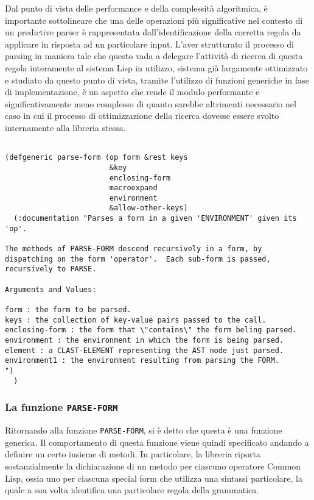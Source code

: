 Dal punto di vista delle performance e della complessità algoritmica, è
importante sottolineare che una delle operazioni più significative nel contesto
di un predictive parser è rappresentata dall’identificazione della corretta
regola da applicare in risposta ad un particolare input. L’aver strutturato il
processo di parsing in maniera tale che questo vada a delegare l'attività di
ricerca di questa regola interamente al sistema Lisp in utilizzo, sistema già
largamente ottimizzato e studiato da questo punto di vista, tramite l’utilizzo
di funzioni generiche in fase di implementazione, è un aspetto che rende il
modulo performante e significativamente meno complesso di quanto sarebbe
altrimenti necessario nel caso in cui il processo di ottimizzazione della
ricerca dovesse essere svolto internamente alla libreria stessa.

\begin{lstlisting}[caption=Signature della funzione \texttt{PARSE-FORM}]

(defgeneric parse-form (op form &rest keys
                        &key
                        enclosing-form
                        macroexpand
                        environment
                        &allow-other-keys)
  (:documentation "Parses a form in a given 'ENVIRONMENT' given its 'op'.

The methods of PARSE-FORM descend recursively in a form, by
dispatching on the form 'operator'.  Each sub-form is passed,
recursively to PARSE.

Arguments and Values:

form : the form to be parsed.
keys : the collection of key-value pairs passed to the call.
enclosing-form : the form that \"contains\" the form beling parsed.
environment : the environment in which the form is being parsed.
element : a CLAST-ELEMENT representing the AST node just parsed.
environment1 : the environment resulting from parsing the FORM.
")
  )

\end{lstlisting}

\subsubsection{La funzione \texttt{PARSE-FORM}}

Ritornando alla funzione \texttt{PARSE-FORM}, si è detto che questa è una
funzione generica. Il comportamento di questa funzione viene quindi specificato
andando a definire un certo insieme di metodi. In particolare, la libreria
riporta sostanzialmente la dichiarazione di un metodo per ciascuno operatore
Common Lisp, ossia uno per ciascuna special form che utilizza una sintassi
particolare, la quale a sua volta identifica una particolare regola della
grammatica.

